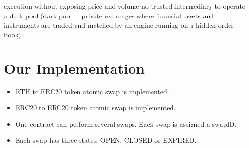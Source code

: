 execution without exposing price and volume 
no trusted intermediary to operate a dark pool (dark pool = private exchanges where financial assets and instruments are traded and matched by an engine running on a hidden order book)

\section{Our Implementation}

\begin{itemize}
  \item ETH to ERC20 token atomic swap is implemented.
  \item ERC20 to ERC20 token atomic swap is implemented. 
  \item One contract can perform several swaps. Each swap is assigned a swapID.   
  \item Each swap has three states: OPEN, CLOSED or EXPIRED.
\end{itemize}
